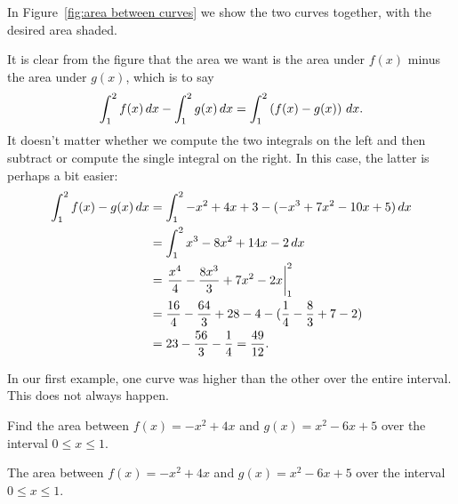 \begin{solution}
In Figure~\ref{fig:area between curves} we show the two curves
together, with the desired area shaded.

It is clear from the figure that the area we want is the area under
$f(x)$ minus the area under $g(x)$, which is to say
\[
\int_1^2 f(x)\, d x-\int_1^2 g(x)\, d x = \int_1^2 \left(f(x)-g(x)\right)\, d x.
\]
It doesn't matter whether we compute the two integrals on the left and
then subtract or compute the single integral on the right. In this
case, the latter is perhaps a bit easier:
\begin{align*}
  \int_1^2 f(x)-g(x)\, d x&=\int_1^2 -x^2+4x+3-(-x^3+7x^2-10x+5)\, d x \\
  &=\int_1^2 x^3-8x^2+14x-2\, d x \\
  &=\left.{x^4\over4}-{8x^3\over3}+7x^2-2x\right|_1^2 \\
  &={16\over4}-{64\over3}+28-4-({1\over4}-{8\over3}+7-2) \\
  &=23-{56\over3}-{1\over4}={49\over12}.
\end{align*}
\end{solution}

In our first example, one curve was higher than the other over the
entire interval. This does not always happen.


\begin{example} Find the area between $f(x)= -x^2+4x$ and
$g(x)=x^2-6x+5$ over the interval $0\le x\le 1$.
\end{example}

\begin{marginfigure}
\caption{The area between $f(x)= -x^2+4x$ and
$g(x)=x^2-6x+5$ over the interval $0\le x\le 1$.}
\label{fig:curves cross}
\end{marginfigure}


